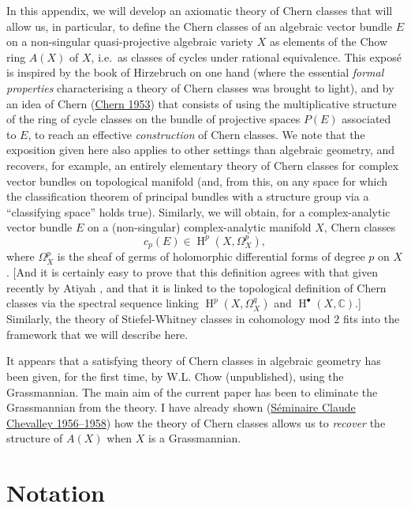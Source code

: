 \documentclass{article}
\newcommand{\oldpage}[1]{\marginpar{\footnotesize$\Big\vert$ \textit{p.~#1}}}
\begin{document}
In this appendix, we will develop an axiomatic theory of Chern classes that will allow us, in particular, to define the Chern classes of an algebraic vector bundle \(E\) on a non-singular quasi-projective algebraic variety \(X\) as elements of the Chow ring \(A(X)\) of \(X\), i.e.~as classes of cycles under rational equivalence.
This exposé is inspired by the book of Hirzebruch on one hand (where the essential \emph{formal properties} characterising a theory of Chern classes was brought to light), and by an idea of Chern (\protect\hyperlink{ref-2}{Chern 1953}) that consists of using the multiplicative structure of the ring of cycle classes on the bundle of projective spaces \(P(E)\) associated to \(E\), to reach an effective \emph{construction} of Chern classes.
We note that the exposition given here also applies to other settings than algebraic geometry, and recovers, for example, an entirely elementary theory of Chern classes for complex vector bundles on topological manifold (and, from this, on any space for which the classification theorem of principal bundles with a structure group via a ``classifying space'' holds true).
Similarly, we will obtain, for a complex-analytic vector bundle \(E\) on a (non-singular) complex-analytic manifold \(X\), Chern classes
\[
  c_p(E) \in \operatorname{H}^p(X,\Omega_X^p),
\]
where \(\Omega_X^p\) is the sheaf of germs of holomorphic differential forms of degree \(p\) on \(X\).
{[}And it is certainly easy to prove that this definition agrees with that given recently by Atiyah \cite{1}, and that it is linked to the topological definition of Chern classes via the spectral sequence linking \(\operatorname{H}^p(X,\Omega_X^q)\) and \(\operatorname{H}^\bullet(X,\mathbb{C})\).{]}
Similarly, the theory of Stiefel-Whitney classes in cohomology mod \(2\) fits into the framework that we will describe here.

\oldpage{138}

It appears that a satisfying theory of Chern classes in algebraic geometry has been given, for the first time, by W.L. Chow (unpublished), using the Grassmannian.
The main aim of the current paper has been to eliminate the Grassmannian from the theory.
I have already shown (\protect\hyperlink{ref-4}{Séminaire Claude Chevalley 1956--1958}) how the theory of Chern classes allows us to \emph{recover} the structure of \(A(X)\) when \(X\) is a Grassmannian.

\hypertarget{section-1}{%
\section{Notation}\label{section-1}}
\end{document}
